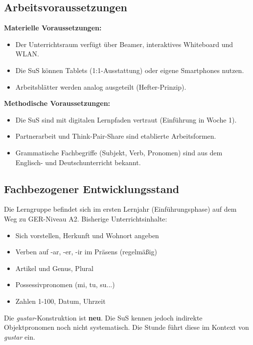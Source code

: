 \documentclass[11pt, a4paper]{article}
\newcommand{\es}[1]{\textcolor{spanisch}{\textit{#1}}}
\begin{document}
\subsection{Arbeitsvoraussetzungen}

\textbf{Materielle Voraussetzungen:}
\begin{itemize}[leftmargin=2em]
    \item Der Unterrichtsraum verfügt über Beamer, interaktives Whiteboard und WLAN.
    \item Die SuS können Tablets (1:1-Ausstattung) oder eigene Smartphones nutzen.
    \item Arbeitsblätter werden analog ausgeteilt (Hefter-Prinzip).
\end{itemize}

\textbf{Methodische Voraussetzungen:}
\begin{itemize}[leftmargin=2em]
    \item Die SuS sind mit digitalen Lernpfaden vertraut (Einführung in Woche 1).
    \item Partnerarbeit und Think-Pair-Share sind etablierte Arbeitsformen.
    \item Grammatische Fachbegriffe (Subjekt, Verb, Pronomen) sind aus dem Englisch- und Deutschunterricht bekannt.
\end{itemize}

\subsection{Fachbezogener Entwicklungsstand}

Die Lerngruppe befindet sich im ersten Lernjahr (Einführungsphase) auf dem Weg zu GER-Niveau A2. Bisherige Unterrichtsinhalte:

\begin{itemize}[leftmargin=2em]
    \item Sich vorstellen, Herkunft und Wohnort angeben
    \item Verben auf -ar, -er, -ir im Präsens (regelmäßig)
    \item Artikel und Genus, Plural
    \item Possessivpronomen (mi, tu, su...)
    \item Zahlen 1-100, Datum, Uhrzeit
\end{itemize}

Die \es{gustar}-Konstruktion ist \textbf{neu}. Die SuS kennen jedoch indirekte Objektpronomen noch nicht systematisch. Die Stunde führt diese im Kontext von \es{gustar} ein.
\end{document}
